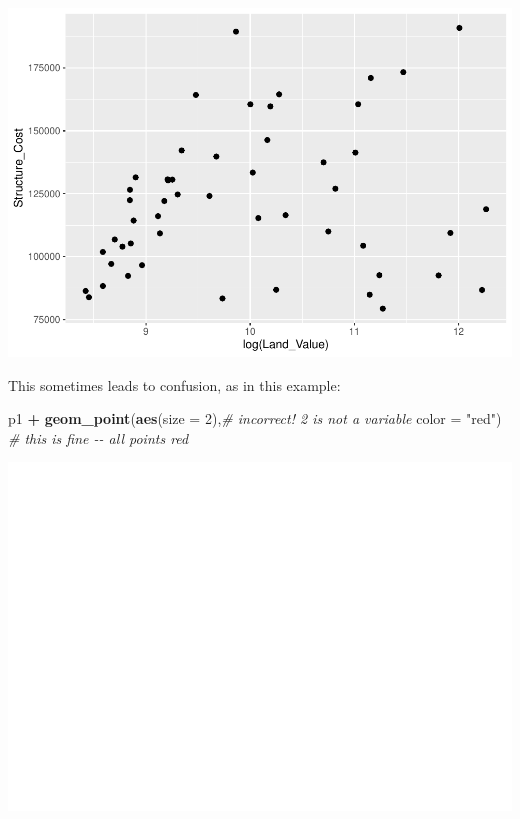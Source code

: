 \documentclass[
]{book}
\newenvironment{Shaded}{\begin{snugshade}}{\end{snugshade}}
\newcommand{\CommentTok}[1]{\textcolor[rgb]{0.56,0.35,0.01}{\textit{#1}}}
\newcommand{\DataTypeTok}[1]{\textcolor[rgb]{0.13,0.29,0.53}{#1}}
\newcommand{\DecValTok}[1]{\textcolor[rgb]{0.00,0.00,0.81}{#1}}
\newcommand{\KeywordTok}[1]{\textcolor[rgb]{0.13,0.29,0.53}{\textbf{#1}}}
\newcommand{\NormalTok}[1]{#1}
\newcommand{\OperatorTok}[1]{\textcolor[rgb]{0.81,0.36,0.00}{\textbf{#1}}}
\newcommand{\StringTok}[1]{\textcolor[rgb]{0.31,0.60,0.02}{#1}}
\begin{document}
\includegraphics{R/Rgraphics/figures/unnamed-chunk-165-1.pdf}

This sometimes leads to confusion, as in this example:

\begin{Shaded}
\begin{Highlighting}[]
\NormalTok{p1 }\OperatorTok{+}
\StringTok{  }\KeywordTok{geom\_point}\NormalTok{(}\KeywordTok{aes}\NormalTok{(}\DataTypeTok{size =} \DecValTok{2}\NormalTok{),}\CommentTok{\# incorrect! 2 is not a variable}
             \DataTypeTok{color =} \StringTok{"red"}\NormalTok{) }\CommentTok{\# this is fine {-}{-} all points red}
\end{Highlighting}
\end{Shaded}

\includegraphics{R/Rgraphics/figures/unnamed-chunk-166-1.pdf}
\end{document}
